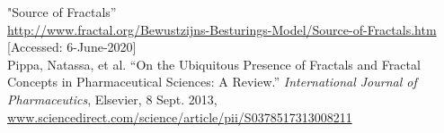 \documentclass{resonance}
\begin{document}
\begin{thebibliography}{99}
"Source of Fractals”\\ \textcolor{blue}{\url{http://www.fractal.org/Bewustzijns-Besturings-Model/Source-of-Fractals.htm}}\\
{[Accessed: 6-June-2020]}\\

Pippa, Natassa, et al. “On the Ubiquitous Presence of Fractals and Fractal Concepts in Pharmaceutical Sciences: A Review.” \textit{International Journal of Pharmaceutics}, Elsevier, 8 Sept. 2013,\\
\textcolor{blue}{\url{www.sciencedirect.com/science/article/pii/S0378517313008211}}

\end{thebibliography}
\end{document}
